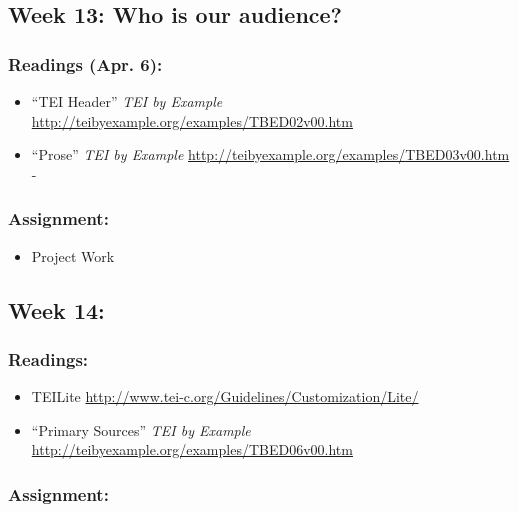 \documentclass[]{article}
\begin{document}
\subsection{Week 13: Who is our
audience?}\label{week-13-who-is-our-audience}

\subsubsection{Readings (Apr. 6):}\label{readings-apr.-6}

\begin{itemize}
\itemsep1pt\parskip0pt
\item
  ``TEI Header'' \emph{TEI by Example}
  \url{http://teibyexample.org/examples/TBED02v00.htm}
\item
  ``Prose'' \emph{TEI by Example}
  \url{http://teibyexample.org/examples/TBED03v00.htm} -
\end{itemize}

\subsubsection{Assignment:}\label{assignment-11}

\begin{itemize}
\itemsep1pt\parskip0pt
\item
  Project Work
\end{itemize}

\subsection{Week 14:}\label{week-14}

\subsubsection{Readings:}\label{readings}

\begin{itemize}
\itemsep1pt\parskip0pt
\item
  TEILite \url{http://www.tei-c.org/Guidelines/Customization/Lite/}
\item
  ``Primary Sources'' \emph{TEI by Example}
  \url{http://teibyexample.org/examples/TBED06v00.htm}
\end{itemize}

\subsubsection{Assignment:}\label{assignment-12}
\end{document}
